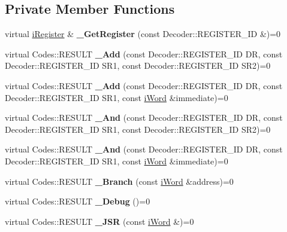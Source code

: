 \subsection*{Private Member Functions}
\begin{DoxyCompactItemize}
\item 
\hypertarget{classiWi11_a1aef52fb147455e393c1209bade341c2}{
virtual \hyperlink{classiRegister}{iRegister} \& {\bfseries \_\-GetRegister} (const Decoder::REGISTER\_\-ID \&)=0}
\label{classiWi11_a1aef52fb147455e393c1209bade341c2}

\item 
\hypertarget{classiWi11_a65f699c773084a631cd7373cae05b5da}{
virtual Codes::RESULT {\bfseries \_\-Add} (const Decoder::REGISTER\_\-ID DR, const Decoder::REGISTER\_\-ID SR1, const Decoder::REGISTER\_\-ID SR2)=0}
\label{classiWi11_a65f699c773084a631cd7373cae05b5da}

\item 
\hypertarget{classiWi11_a6345dc089e3a699bd30fc442bd8f6d85}{
virtual Codes::RESULT {\bfseries \_\-Add} (const Decoder::REGISTER\_\-ID DR, const Decoder::REGISTER\_\-ID SR1, const \hyperlink{classiWord}{iWord} \&immediate)=0}
\label{classiWi11_a6345dc089e3a699bd30fc442bd8f6d85}

\item 
\hypertarget{classiWi11_a90cd8f3daa1788f029cabe198c19efb3}{
virtual Codes::RESULT {\bfseries \_\-And} (const Decoder::REGISTER\_\-ID DR, const Decoder::REGISTER\_\-ID SR1, const Decoder::REGISTER\_\-ID SR2)=0}
\label{classiWi11_a90cd8f3daa1788f029cabe198c19efb3}

\item 
\hypertarget{classiWi11_a4785e197f77fb0861e97e8d18c3be96f}{
virtual Codes::RESULT {\bfseries \_\-And} (const Decoder::REGISTER\_\-ID DR, const Decoder::REGISTER\_\-ID SR1, const \hyperlink{classiWord}{iWord} \&immediate)=0}
\label{classiWi11_a4785e197f77fb0861e97e8d18c3be96f}

\item 
\hypertarget{classiWi11_a42d2c50609424634873413d7a6614397}{
virtual Codes::RESULT {\bfseries \_\-Branch} (const \hyperlink{classiWord}{iWord} \&address)=0}
\label{classiWi11_a42d2c50609424634873413d7a6614397}

\item 
\hypertarget{classiWi11_ae510f127a0c3b87d42cdbe5b14204a65}{
virtual Codes::RESULT {\bfseries \_\-Debug} ()=0}
\label{classiWi11_ae510f127a0c3b87d42cdbe5b14204a65}

\item 
\hypertarget{classiWi11_a0e1e16df5483aaa32e004fe125f95f70}{
virtual Codes::RESULT {\bfseries \_\-JSR} (const \hyperlink{classiWord}{iWord} \&)=0}
\label{classiWi11_a0e1e16df5483aaa32e004fe125f95f70}


\end{DoxyCompactItemize}
